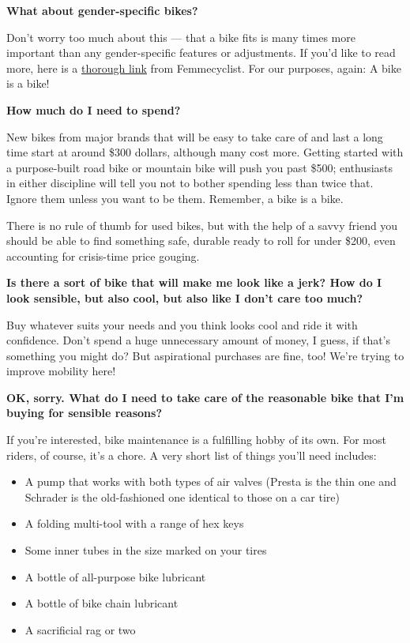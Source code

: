 \textbf{What about gender-specific bikes?}

Don't worry too much about this --- that a bike fits is many times more
important than any gender-specific features or adjustments. If you'd
like to read more, here is a
\href{https://www.femmecyclist.com/mens-vs-womens-bikes/}{thorough link}
from Femmecyclist. For our purposes, again: A bike is a bike!

\textbf{How much do I need to spend?}

New bikes from major brands that will be easy to take care of and last a
long time start at around \$300 dollars, although many cost more.
Getting started with a purpose-built road bike or mountain bike will
push you past \$500; enthusiasts in either discipline will tell you not
to bother spending less than twice that. Ignore them unless you want to
be them. Remember, a bike is a bike.

There is no rule of thumb for used bikes, but with the help of a savvy
friend you should be able to find something safe, durable ready to roll
for under \$200, even accounting for crisis-time price gouging.

\textbf{Is there a sort of bike that will make me look like a jerk? How
do I look sensible, but also cool, but also like I don't care too much?}

Buy whatever suits your needs and you think looks cool and ride it with
confidence. Don't spend a huge unnecessary amount of money, I guess, if
that's something you might do? But aspirational purchases are fine, too!
We're trying to improve mobility here!

\textbf{OK, sorry. What do I need to take care of the reasonable bike
that I'm buying for sensible reasons?}

If you're interested, bike maintenance is a fulfilling hobby of its own.
For most riders, of course, it's a chore. A very short list of things
you'll need includes:

\begin{itemize}
\item
  A pump that works with both types of air valves (Presta is the thin
  one and Schrader is the old-fashioned one identical to those on a car
  tire)
\item
  A folding multi-tool with a range of hex keys
\item
  Some inner tubes in the size marked on your tires
\item
  A bottle of all-purpose bike lubricant
\item
  A bottle of bike chain lubricant
\item
  A sacrificial rag or two
\end{itemize}

